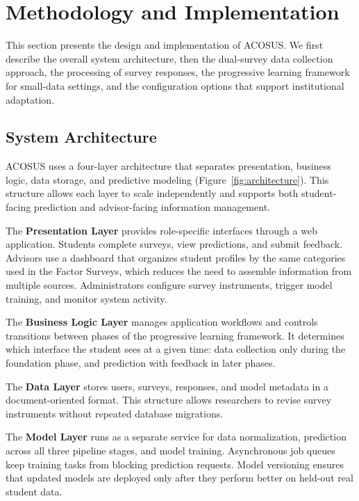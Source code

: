 \documentclass[letterpaper,11pt]{article}
\begin{document}
\section{Methodology and Implementation}\label{sec:methodology}

This section presents the design and implementation of ACOSUS. We first describe the overall system architecture, then the dual-survey data collection approach, the processing of survey responses, the progressive learning framework for small-data settings, and the configuration options that support institutional adaptation.

\subsection{System Architecture}\label{subsec:sysarch}

ACOSUS uses a four-layer architecture that separates presentation, business logic, data storage, and predictive modeling (Figure~\ref{fig:architecture}). This structure allows each layer to scale independently and supports both student-facing prediction and advisor-facing information management.

The \textbf{Presentation Layer} provides role-specific interfaces through a web application. Students complete surveys, view predictions, and submit feedback. Advisors use a dashboard that organizes student profiles by the same categories used in the Factor Surveys, which reduces the need to assemble information from multiple sources. Administrators configure survey instruments, trigger model training, and monitor system activity.

The \textbf{Business Logic Layer} manages application workflows and controls transitions between phases of the progressive learning framework. It determines which interface the student sees at a given time: data collection only during the foundation phase, and prediction with feedback in later phases.

The \textbf{Data Layer} stores users, surveys, responses, and model metadata in a document-oriented format. This structure allows researchers to revise survey instruments without repeated database migrations.

The \textbf{Model Layer} runs as a separate service for data normalization, prediction across all three pipeline stages, and model training. Asynchronous job queues keep training tasks from blocking prediction requests. Model versioning ensures that updated models are deployed only after they perform better on held-out real student data.
\end{document}
